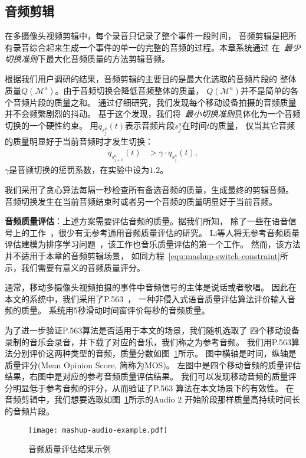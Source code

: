 \subsection{音频剪辑}
在多摄像头视频剪辑中，每个录音只记录了整个事件一段时间，
音频剪辑是把所有录音综合起来生成一个事件的单一的完整的音频的过程。本章系统通过
在~\emph{最少切换准则}下最大化音频质量的方法剪辑音频。

根据我们用户调研的结果，音频剪辑的主要目的是最大化选取的音频片段的
整体质量$Q(\mathcal{M}^a)$。由于音频切换会降低音频整体的质量，
$Q(\mathcal{M}^a)$并不是简单的各个音频片段的质量之和。
通过仔细研究，我们发现每个移动设备拍摄的音频质量并不会频繁剧烈的抖动。
基于这个发现，我们将~\emph{最小切换准则}具体化为一个音频切换的一个硬性约束。
用$q_{s_j^a}(t)$表示音频片段$s_j^a$在时间$t$的质量，
仅当其它音频的质量明显好于当前音频时才发生切换：
\begin{eqnarray}
	q_{s_{j+1}^a}{(t)} & > \gamma \cdot q_{s_j^a}{(t)},
	\label{equ:mashup-switch-constraint}
\end{eqnarray}
$\gamma$是音频切换的惩罚系数，在实验中设为$1.2$。

我们采用了贪心算法每隔一秒检查所有备选音频的质量，生成最终的剪辑音频。
音频切换发生在当前音频结束时或者另一个音频的质量明显好于当前音频。

\textbf{音频质量评估}：上述方案需要评估音频的质量。据我们所知，
除了一些在语音信号上的工作~\cite{CampbellJG09}，很少有无参考通用音频质量评估的研究。
Li等人将无参考音频质量评估建模为排序学习问题~\cite{LiWCDWW13}，该工作也音乐质量评估的第一个工作。
然而，该方法并不适用于本章的音频剪辑场景，
如同方程~\eqref{equ:mashup-switch-constraint}所示，我们需要有意义的音频质量评分。

通常，移动多摄像头视频拍摄的事件中音频信号的主体是说话或者歌唱。
因此在本文的系统中，我们采用了P.563~\cite{RixBKKG06}，
一种非侵入式语音质量评估算法评价输入音频的质量。
系统用5秒滑动时间窗评价每秒的音频质量。


为了进一步验证P.563算法是否适用于本文的场景，我们随机选取了
四个移动设备录制的音乐会录音，并下载了对应的音乐，我们称之为参考音频。
我们用P.563算法分别评价这两种类型的音频，质量分数如图~\ref{fig:mashup-audio-example}所示。
图中横轴是时间，纵轴是质量评分(Mean Opinion Score, 简称为MOS)。
左图中是四个移动音频的质量评估结果，右图中是对应的参考音频质量评估结果。
我们可以发现移动音频的质量评分明显低于参考音频的评分，从而验证了P.563
算法在本文场景下的有效性。
在音频剪辑中，我们想要选取如图~\ref{fig:mashup-audio-example}所示的Audio 2
开始阶段那样质量高持续时间长的音频片段。
\begin{figure}[ht]
    \centering
    \texttt{[image: mashup-audio-example.pdf]}
    \caption{音频质量评估结果示例}
    \label{fig:mashup-audio-example}
\end{figure}

